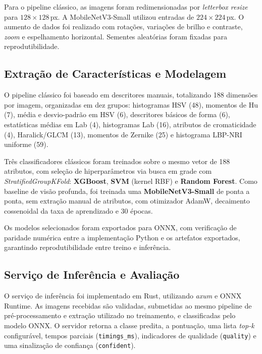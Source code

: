 \documentclass[12pt]{article}
\providecommand{\gls}[1]{\textnormal{\textsc{#1}}}
\begin{document}
Para o pipeline clássico, as imagens foram redimensionadas por
\textit{letterbox resize} para $128\times128$\,px. A MobileNetV3-Small
utilizou entradas de $224\times224$\,px. O aumento de dados foi realizado
com rotações, variações de brilho e contraste, \textit{zoom} e espelhamento
horizontal. Sementes aleatórias foram fixadas para reprodutibilidade.

\subsection{Extração de Características e Modelagem}

O pipeline clássico foi baseado em descritores manuais, totalizando 188
dimensões por imagem, organizadas em dez grupos: histogramas \gls{HSV} (48),
momentos de Hu (7), média e desvio-padrão em \gls{HSV} (6), descritores
básicos de forma (6), estatísticas médias em Lab (4), histogramas Lab (16),
atributos de cromaticidade (4), Haralick/\gls{GLCM} (13), momentos de Zernike
(25) e histograma LBP-NRI uniforme (59).

Três classificadores clássicos foram treinados sobre o mesmo vetor de 188
atributos, com seleção de hiperparâmetros via busca em grade com
\textit{StratifiedGroupKFold}: \textbf{XGBoost}, \textbf{SVM} (kernel
RBF) e \textbf{Random Forest}. Como baseline de visão profunda, foi treinada
uma \textbf{MobileNetV3-Small} de ponta a ponta, sem extração manual de
atributos, com otimizador AdamW, decaimento cossenoidal da taxa de
aprendizado e 30 épocas.

Os modelos selecionados foram exportados para ONNX, com verificação de
paridade numérica entre a implementação Python e os artefatos exportados,
garantindo reprodutibilidade entre treino e inferência.

\subsection{Serviço de Inferência e Avaliação}
\label{sec:servico}

O serviço de inferência foi implementado em Rust, utilizando \textit{axum} e
ONNX Runtime. As imagens recebidas são validadas, submetidas ao mesmo
pipeline de pré-processamento e extração utilizado no treinamento, e
classificadas pelo modelo ONNX. O servidor retorna a classe predita, a
pontuação, uma lista \textit{top-k} configurável, tempos parciais
(\texttt{timings\_ms}), indicadores de qualidade (\texttt{quality}) e uma
sinalização de confiança (\texttt{confident}).
\end{document}

